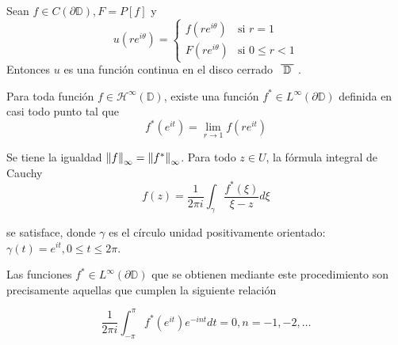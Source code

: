 \begin{theorem}
\label{fatouaux2}
    Sean $f \in C (\partial \mathbb{D}), F=P[f]$ y
    \begin{equation*}
        u(re^{i \theta}) =
        \begin{cases}
            f(re^{i\theta}) & \text{si } r=1\\ F(re^{i\theta}) & \text{si } 0 \leq r<1
        \end{cases}
    \end{equation*}
    Entonces $u$ es una función continua en el disco cerrado $\xbar{\mathbb{D}}$.
\end{theorem}

\begin{theorem}
    Para toda función $f \in \mathcal{H}^\infty(\mathbb{D})$, existe una función $f^* \in L^{\infty} (\partial \mathbb{D})$ definida en casi todo punto tal que
    \begin{equation}
        \label{fatou1}
        f^*(e^{it}) = \lim_{r \rightarrow 1} f(re^{it})
    \end{equation}

    Se tiene la igualdad $\left\lVert f\right\rVert_{\infty} = \left\lVert f^*\right\rVert_{\infty}$. Para todo $z \in U$, la fórmula integral de Cauchy
    \begin{equation}
        \label{fatou2}
        f(z) = \dfrac{1}{2 \pi i} \int_{\gamma} \dfrac{f^*(\xi)}{\xi - z} d\xi
    \end{equation}

    se satisface, donde $\gamma$ es el círculo unidad positivamente orientado: $\gamma(t) = e^{it}, 0 \leq t \leq 2 \pi$.

    Las funciones $f^* \in L^{\infty}(\partial \mathbb{D})$ que se obtienen mediante este procedimiento son precisamente aquellas que cumplen la siguiente relación

    \begin{equation}
        \label{fatou3}
        \dfrac{1}{2 \pi i} \int_{-\pi}^{\pi} f^*(e^{it})e^{-int} dt = 0, n = -1,-2, \dots
    \end{equation}
\end{theorem}

